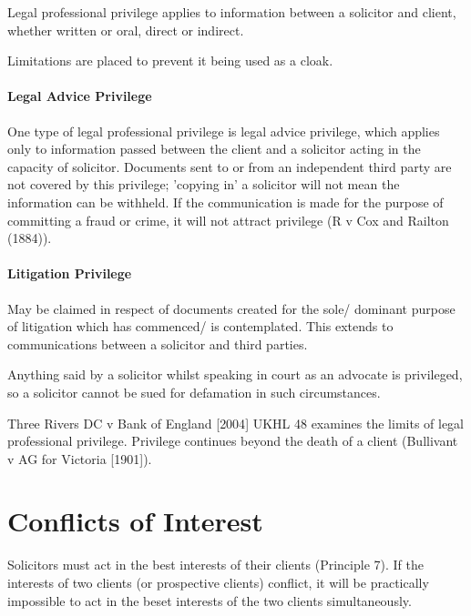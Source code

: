 \documentclass[
]{article}
\begin{document}
Legal professional privilege applies to information between a solicitor
and client, whether written or oral, direct or indirect.

Limitations are placed to prevent it being used as a cloak.

\hypertarget{legal-advice-privilege}{%
\paragraph{Legal Advice Privilege}\label{legal-advice-privilege}}

One type of legal professional privilege is legal advice privilege,
which applies only to information passed between the client and a
solicitor acting in the capacity of solicitor. Documents sent to or from
an independent third party are not covered by this privilege; 'copying
in' a solicitor will not mean the information can be withheld. If the
communication is made for the purpose of committing a fraud or crime, it
will not attract privilege (R v Cox and Railton (1884)).

\hypertarget{litigation-privilege}{%
\paragraph{Litigation Privilege}\label{litigation-privilege}}

May be claimed in respect of documents created for the sole/ dominant
purpose of litigation which has commenced/ is contemplated. This extends
to communications between a solicitor and third parties.

Anything said by a solicitor whilst speaking in court as an advocate is
privileged, so a solicitor cannot be sued for defamation in such
circumstances.

Three Rivers DC v Bank of England {[}2004{]} UKHL 48 examines the limits
of legal professional privilege. Privilege continues beyond the death of
a client (Bullivant v AG for Victoria {[}1901{]}).

\hypertarget{conflicts-of-interest}{%
\section{Conflicts of Interest}\label{conflicts-of-interest}}

Solicitors must act in the best interests of their clients (Principle
7). If the interests of two clients (or prospective clients) conflict,
it will be practically impossible to act in the beset interests of the
two clients simultaneously.
\end{document}
